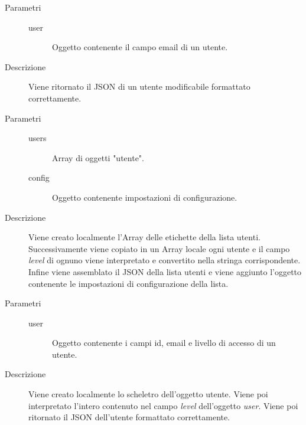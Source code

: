 \begin{description}
\begin{mldescription}
    \hfill
   \begin{description}
    \item[Parametri]
     \begin{description}
      \item[user]
      Oggetto contenente il campo email di un utente.
     \end{description}
    \item[Descrizione]
    Viene ritornato il JSON di un utente modificabile formattato correttamente.
   \end{description}
   
    \hfill
   \begin{description}
    \item[Parametri]
     \begin{description}
      \item[users]
      Array di oggetti "utente".
      \item[config]
      Oggetto contenente impostazioni di configurazione.
     \end{description}
    \item[Descrizione]
    Viene creato localmente l'Array delle etichette della lista utenti. Successivamente viene copiato in un Array locale ogni utente e il campo \textit{level} di ognuno viene interpretato e convertito nella stringa corrispondente. Infine viene assemblato il JSON della lista utenti e viene aggiunto l'oggetto contenente le impostazioni di configurazione della lista.
   \end{description}
   
    \hfill
   \begin{description}
    \item[Parametri]
     \begin{description}
      \item[user]
      Oggetto contenente i campi id, email e livello di accesso di un utente.
     \end{description}
    \item[Descrizione]
    Viene creato localmente lo scheletro dell'oggetto utente. Viene poi interpretato l'intero contenuto nel campo \textit{level} dell'oggetto \textit{user}. Viene poi ritornato il JSON dell'utente formattato correttamente.
   \end{description}
   
 \end{mldescription}
 
\end{description}

